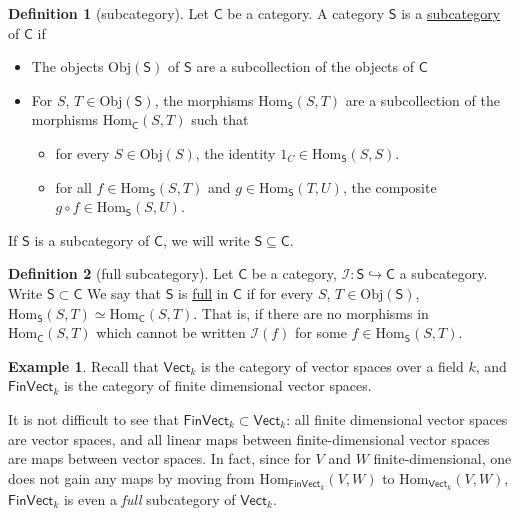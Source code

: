\documentclass[a4paper,10pt]{scrreprt}
\newcommand{\defn}[1]{\ul{#1}}
\newcommand{\Obj}{\mathrm{Obj}}
\newcommand{\Hom}{\mathrm{Hom}}
\theoremstyle{definition}
\newtheorem{definition}{Definition}[section]
\newtheorem{example}{Example}[section]
\theoremstyle{plain}
\theoremstyle{remark}
\begin{document}
\begin{definition}[subcategory]
  \label{def:subcategory}
  Let $\mathsf{C}$ be a category. A category $\mathsf{S}$ is a \defn{subcategory} of $\mathsf{C}$ if
  \begin{itemize}
    \item The objects $\Obj(\mathsf{S})$ of $\mathsf{S}$ are a subcollection of the objects of $\mathsf{C}$

    \item For $S$, $T \in \Obj(\mathsf{S})$, the morphisms $\Hom_{\mathsf{S}}(S, T)$ are a subcollection of the morphisms $\Hom_{\mathsf{C}}(S, T)$ such that
      \begin{itemize}
        \item for every $S \in \Obj(S)$, the identity $1_{C} \in \Hom_{\mathsf{S}}(S, S)$.

        \item for all $f \in \Hom_{\mathsf{S}}(S, T)$ and $g \in \Hom_{\mathsf{S}}(T, U)$, the composite $g \circ f \in \Hom_{\mathsf{S}}(S, U)$.
      \end{itemize}
  \end{itemize} 

  If $\mathsf{S}$ is a subcategory of $\mathsf{C}$, we will write $\mathsf{S} \subseteq \mathsf{C}$.
\end{definition}

\begin{definition}[full subcategory]
  \label{def:fullsubcategory}
  Let $\mathsf{C}$ be a category, $\mathcal{I}\colon \mathsf{S} \hookrightarrow \mathsf{C}$ a subcategory. Write $\mathsf{S} \subset \mathsf{C}$ We say that $\mathsf{S}$ is \defn{full} in $\mathsf{C}$ if for every $S$, $T \in \Obj(\mathsf{S})$, $\Hom_{\mathsf{S}}(S, T) \simeq \Hom_{\mathsf{C}}(S, T)$. That is, if there are no morphisms in $\Hom_{\mathsf{C}}(S, T)$ which cannot be written $\mathcal{I}(f)$ for some $f \in \Hom_{\mathsf{S}}(S, T)$.
\end{definition}

\begin{example}
  \label{eg:finvectfullsubcategoryofvect}
  Recall that $\mathsf{Vect}_{k}$ is the category of vector spaces over a field $k$, and $\mathsf{FinVect}_{k}$ is the category of finite dimensional vector spaces. 

  It is not difficult to see that $\mathsf{FinVect}_{k} \subset \mathsf{Vect}_{k}$: all finite dimensional vector spaces are vector spaces, and all linear maps between finite-dimensional vector spaces are maps between vector spaces. In fact, since for $V$ and $W$ finite-dimensional, one does not gain any maps by moving from $\Hom_{\mathsf{FinVect}_{k}}(V, W)$ to $\Hom_{\mathsf{Vect}_{k}}(V, W)$, $\mathsf{FinVect}_{k}$ is even a \emph{full} subcategory of $\mathsf{Vect}_{k}$.
\end{example}
\end{document}
